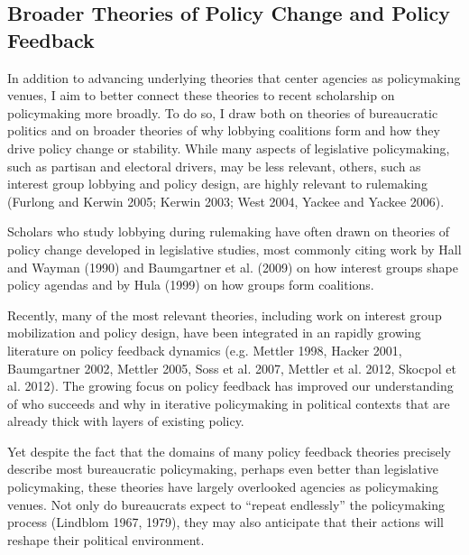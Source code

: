 
\subsection{Broader Theories of Policy Change and Policy Feedback}


In addition to advancing underlying theories that center agencies as policymaking venues, I aim to better connect these theories to recent scholarship on policymaking more broadly. To do so, I draw both on theories of bureaucratic politics and on broader theories of why lobbying coalitions form and how they drive policy change or stability. While many aspects of legislative policymaking, such as partisan and electoral drivers, may be less relevant, others, such as interest group lobbying and policy design, are highly relevant to rulemaking (Furlong and Kerwin 2005; Kerwin 2003; West 2004, Yackee and Yackee 2006).

Scholars who study lobbying during rulemaking have often drawn on theories of policy change developed in legislative studies, most commonly citing work by Hall and Wayman (1990) and Baumgartner et al. (2009) on how interest groups shape policy agendas and by Hula (1999) on how groups form coalitions. 

Recently, many of the most relevant theories, including work on interest group mobilization and policy design, have been integrated in an rapidly growing literature on policy feedback dynamics (e.g. Mettler 1998, Hacker 2001, Baumgartner 2002, Mettler 2005, Soss et al. 2007, Mettler et al. 2012, Skocpol et al. 2012). The growing focus on policy feedback has improved our understanding of who succeeds and why in iterative policymaking in political contexts that are already thick with layers of existing policy. 

Yet despite the fact that the domains of many policy feedback theories precisely describe most bureaucratic policymaking, perhaps even better than legislative policymaking, these theories have largely overlooked agencies as policymaking venues. Not only do bureaucrats expect to ``repeat endlessly'' the policymaking process (Lindblom 1967, 1979), they may also anticipate that their actions will reshape their political environment. 



